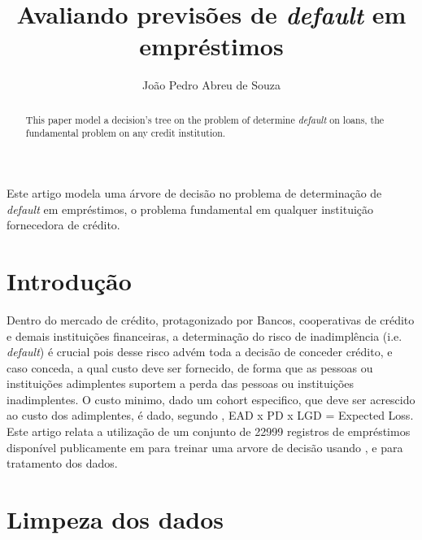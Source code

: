 \documentclass[12pt]{article}
\title{Avaliando previsões de \textit{default} em empréstimos}
\author{João Pedro Abreu de Souza\inst{1}}
\begin{document}
 

\maketitle

\begin{abstract}
  This paper model a decision's tree on the problem of determine \textit{default} on loans, the fundamental problem on any credit institution.
\end{abstract}
     
\begin{resumo} 
  Este artigo modela uma árvore de decisão no problema de determinação de \textit{default} em empréstimos, o problema fundamental em qualquer instituição fornecedora de crédito.
  
\end{resumo}


\section{Introdução}

Dentro do mercado de crédito, protagonizado por Bancos, cooperativas de crédito e demais instituições financeiras, a determinação do risco de inadimplência (i.e. \textit{default}) é crucial pois desse risco advém toda a decisão de conceder crédito, e caso conceda, a qual custo deve ser fornecido, de forma que as pessoas ou instituições adimplentes suportem a perda das pessoas ou instituições inadimplentes. O custo minimo, dado um cohort especifico, que deve ser acrescido ao custo dos adimplentes, é dado, segundo \cite{investopedia}, EAD x PD x LGD = Expected Loss. Este artigo relata a utilização de um conjunto de 22999 registros de empréstimos disponível publicamente em \cite{kaggle} para treinar uma arvore de decisão usando \cite{scikit}, \cite{pandas} e \cite{numpy} para tratamento dos dados.

\section{Limpeza dos dados} \label{sec:firstpage}
\end{document}
